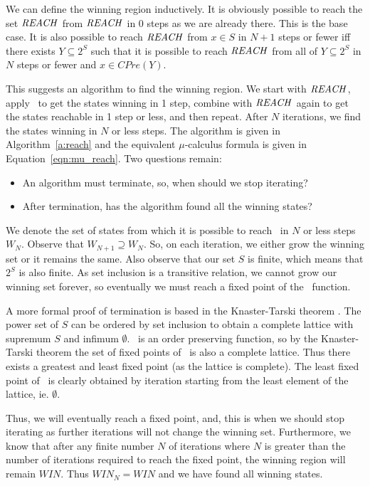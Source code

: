 We can define the winning region inductively. It is obviously possible to reach the set $\mathit{REACH}$ from $\mathit{REACH}$ in 0 steps as we are already there. This is the base case. It is also possible to reach $\mathit{REACH}$ from $x \in S$ in $N + 1$ steps or fewer iff there exists $Y\subseteq 2^S$ such that it is possible to reach $\mathit{REACH}$ from all of $Y \subseteq 2^S$ in $N$ steps or fewer and $x \in CPre(Y)$.

This suggests an algorithm to find the winning region. We start with $\mathit{REACH}$, apply \cpre\ to get the states winning in 1 step, combine with $\mathit{REACH}$ again to get the states reachable in 1 step or less, and then repeat. After $N$ iterations, we find the states winning in $N$ or less steps. The algorithm is given in Algorithm~\ref{a:reach} and the equivalent $\mu$-calculus formula is given in Equation~\ref{eqn:mu_reach}. Two questions remain: 

\begin{itemize}
    \item An algorithm must terminate, so, when should we stop iterating?
    \item After termination, has the algorithm found all the winning states?
\end{itemize}

We denote the set of states from which it is possible to reach \reach\ in $N$ or less steps $W_N$. Observe that $W_{N+1} \supseteq W_N$. So, on each iteration, we either grow the winning set or it remains the same. Also observe that our set $S$ is finite, which means that $2^S$ is also finite. As set inclusion is a transitive relation, we cannot grow our winning set forever, so eventually we must reach a fixed point of the \cpre\ function. 

A more formal proof of termination is based in the Knaster-Tarski theorem \cite{knaster_tarski}. The power set of $S$ can be ordered by set inclusion to obtain a complete lattice with supremum $S$ and infimum $\emptyset$. \cpre\ is an order preserving function, so by the Knaster-Tarski theorem the set of fixed points of \cpre\ is also a complete lattice. Thus there exists a greatest and least fixed point (as the lattice is complete). The least fixed point of \cpre\ is clearly obtained by iteration starting from the least element of the lattice, ie. $\emptyset$. 

Thus, we will eventually reach a fixed point, and, this is when we should stop iterating as further iterations will not change the winning set. Furthermore, we know that after any finite number $N$ of iterations where $N$ is greater than the number of iterations required to reach the fixed point, the winning region will remain $WIN$. Thus $WIN_N = WIN$ and we have found all winning states.

